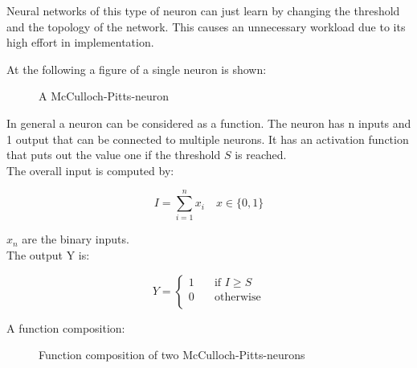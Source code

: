 \documentclass[10pt,a4paper,DIV=11]{scrreprt}
\begin{document}
Neural networks of this type of neuron can just learn by changing the threshold and the topology of the network. This causes an unnecessary workload due to its high effort in implementation.

At the following a figure of a single neuron is shown:

\begin{figure}[H]  %
	\centering
	\caption{A McCulloch-Pitts-neuron}
	\label{fig:pitts1}
\end{figure}

In general a neuron can be considered as a function.
The neuron has n inputs and 1 output that can be connected to multiple neurons. It has an activation function that puts out the value one if the threshold $S$ is reached. \\

The overall input is computed by:

\begin{equation}
I = \sum_{i=1}^{n} x_{i} \quad  x \in \{0, 1\}
\end{equation}

$x_{n}$ are the binary inputs. \\

The output Y is:


\[ Y =
\begin{cases}
1       & \quad \text{if } I  \geq S \\
0  & \quad \text{otherwise}\\
\end{cases}
\]

A function composition:

\begin{figure}[H]
	\centering
	\caption{Function composition of two McCulloch-Pitts-neurons}
	\label{fig:pitts2}
\end{figure}
\end{document}
